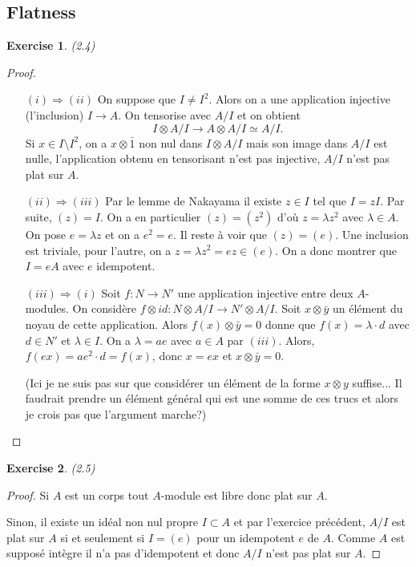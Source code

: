 \documentclass[A4, 11pt]{article}
\newtheorem{exer}{Exercise}
\begin{document}
\subsection{Flatness}
\begin{exer}(2.4)

\end{exer}
\begin{proof}
\begin{itemize}
\item[$(i)\Rightarrow (ii)$] On suppose que $I\neq I^2$. Alors on a une application injective (l'inclusion) $I\rightarrow A$. On tensorise avec $A/I$ et on obtient
$$I\otimes A/I \rightarrow A \otimes A/I \simeq A/I.$$
Si $x\in I\setminus I^2$, on a $x\otimes \bar{1}$ non nul dans $I\otimes A/I$ mais son image dans $A/I$ est nulle, l'application obtenu en tensorisant n'est pas injective, $A/I$ n'est pas plat sur $A$. 

\item[$(ii)\Rightarrow (iii)$] Par le lemme de Nakayama il existe $z\in I$ tel que $I=zI$. Par suite, $(z)=I$. On a en particulier $(z)=(z^2)$ d'où $z=\lambda z^2$ avec $\lambda\in A$. On pose $e=\lambda z$ et on a $e^2=e$. Il reste à voir que $(z)=(e)$. Une inclusion est triviale, pour l'autre, on a $z=\lambda z^2= ez \in (e)$. On a donc montrer que $I=eA$ avec $e$ idempotent. 

\item[$(iii)\Rightarrow (i)$] Soit $f\colon N\rightarrow N'$ une application injective entre deux $A$-modules. On considère $f\otimes id\colon N\otimes A/I \rightarrow N'\otimes A/I$. Soit $x\otimes \bar{y}$ un élément du noyau de cette application. Alors $f(x)\otimes \bar{y}=0$ donne que $f(x)=\lambda \cdot d$ avec $d\in N'$ et $\lambda \in I$. On a $\lambda=ae$ avec $a\in A$ par $(iii)$. Alors, $f(ex)=ae^2\cdot d= f(x)$, donc $x=ex$ et $x\otimes \bar{y}=0$. 

(Ici je ne suis pas sur que considérer un élément de la forme $x\otimes y$ suffise... Il faudrait prendre un élément général qui est une somme de ces trucs et alors je crois pas que l'argument marche?)
\end{itemize}
\end{proof}
\begin{exer}(2.5)
\end{exer}
\begin{proof}
Si $A$ est un corps tout $A$-module est libre donc plat sur $A$. 

Sinon, il existe un idéal non nul propre $I\subset A$ et par l'exercice précédent, $A/I$ est plat sur $A$ si et seulement si $I=(e)$ pour un idempotent $e$ de $A$. Comme $A$ est supposé intègre il n'a pas d'idempotent et donc $A/I$ n'est pas plat sur $A$.
\end{proof}
\end{document}
